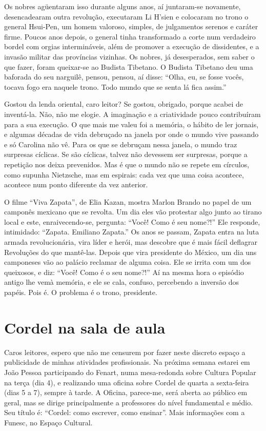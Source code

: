 Os nobres agüentaram isso durante alguns anos, aí juntaram-se
novamente, desencadearam outra revolução, executaram Li H’sien e
colocaram no trono o general Hsui-Pen, um homem valoroso, simples, de
julgamentos serenos e caráter firme.  Poucos anos depois, o general
tinha transformado a corte num verdadeiro bordel com orgias
intermináveis, além de promover a execução de dissidentes, e a
invasão militar das províncias vizinhas.  Os nobres, já desesperados,
sem saber o que fazer, foram queixar-se ao Budista Tibetano. O
Budista Tibetano deu uma baforada do seu narguilê, pensou, pensou, aí
disse: “Olha, eu, se fosse vocês, tocava fogo era naquele trono. Todo
mundo que se senta lá fica assim.”

Gostou da lenda oriental, caro leitor? Se gostou, obrigado, porque
acabei de inventá-la. Não, não me elogie. A imaginação e a
criatividade pouco contribuíram para a sua execução. O que mais me
valeu foi a memória, o hábito de ler jornais, e algumas décadas de
vida debruçado na janela por onde o mundo vive passando e só Carolina
não vê.  Para os que se debruçam nessa janela, o mundo traz surpresas
cíclicas. Se são cíclicas, talvez não devessem ser surpresas, porque
a repetição nos deixa prevenidos. Mas é que o mundo não se repete em
círculos, como supunha Nietzsche, mas em espirais: cada vez que uma
coisa acontece, acontece num ponto diferente da vez anterior.

O filme “Viva Zapata”, de Elia Kazan, mostra Marlon Brando no papel de
um camponês mexicano que se revolta. Um dia eles vão protestar algo
junto ao tirano local e este, enraivecendo-se, pergunta: “Você! Como
é seu nome?!”  Ele responde, intimidado: “Zapata. Emiliano Zapata.” 
Os anos se passam, Zapata entra na luta armada revolucionária, vira
líder e herói, mas descobre que é mais fácil deflagrar Revoluções do
que mantê-las. Depois que vira presidente do México, um dia uns
camponeses vão ao palácio reclamar de alguma coisa. Ele se irrita com
um dos queixosos, e diz: “Você! Como é o seu nome?!” Aí na mesma hora
o episódio antigo lhe vemà memória, e ele se cala, confuso,
percebendo a inversão dos papéis. Pois é. O problema é o trono,
presidente.

\chapter{Cordel na sala de aula}

Caros leitores, espero que não me censurem por fazer neste discreto
espaço a publicidade de minhas atividades profissionais. Na próxima
semana estarei em João Pessoa participando do Fenart, numa
mesa-redonda sobre Cultura Popular na terça (dia 4), e realizando uma
oficina sobre Cordel de quarta a sexta-feira (dias 5 a 7), sempre à
tarde. A Oficina, parece-me, será aberta ao público em geral, mas se
dirige principalmente a professores do nível fundamental e médio. Seu
título é: “Cordel: como escrever, como ensinar”. Mais informações com
a Funesc, no Espaço Cultural.

